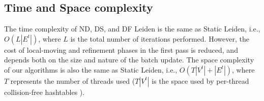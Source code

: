 \subsection{Time and Space complexity}

The time complexity of ND, DS, and DF Leiden is the same as Static Leiden, i.e., $O(L|E^t|)$, where $L$ is the total number of iterations performed. However, the cost of local-moving and refinement phases in the first pass is reduced, and depends both on the size and nature of the batch update. The space complexity of our algorithms is also the same as Static Leiden, i.e., $O(T|V^t| + |E^t|)$, where $T$ represents the number of threads used ($T|V^t|$ is the space used by per-thread collision-free hashtables \cite{sahu2024fast}).
% 
